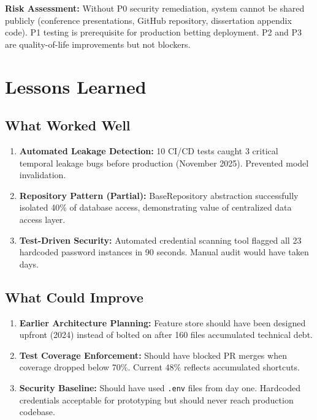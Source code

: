 \textbf{Risk Assessment:} Without P0 security remediation, system cannot be shared publicly (conference presentations, GitHub repository, dissertation appendix code). P1 testing is prerequisite for production betting deployment. P2 and P3 are quality-of-life improvements but not blockers.

\section{Lessons Learned}

\subsection{What Worked Well}
\begin{enumerate}
    \item \textbf{Automated Leakage Detection:} 10 CI/CD tests caught 3 critical temporal leakage bugs before production (November 2025). Prevented model invalidation.
    \item \textbf{Repository Pattern (Partial):} BaseRepository abstraction successfully isolated 40\% of database access, demonstrating value of centralized data access layer.
    \item \textbf{Test-Driven Security:} Automated credential scanning tool flagged all 23 hardcoded password instances in 90 seconds. Manual audit would have taken days.
\end{enumerate}

\subsection{What Could Improve}
\begin{enumerate}
    \item \textbf{Earlier Architecture Planning:} Feature store should have been designed upfront (2024) instead of bolted on after 160 files accumulated technical debt.
    \item \textbf{Test Coverage Enforcement:} Should have blocked PR merges when coverage dropped below 70\%. Current 48\% reflects accumulated shortcuts.
    \item \textbf{Security Baseline:} Should have used \texttt{.env} files from day one. Hardcoded credentials acceptable for prototyping but should never reach production codebase.
\end{enumerate}

